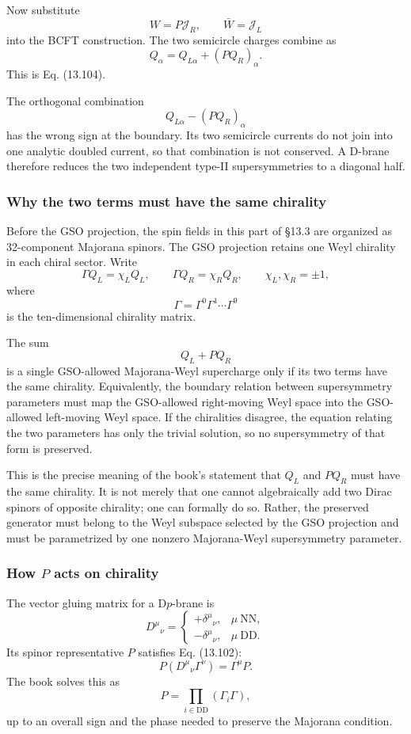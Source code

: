 \documentclass[
  10pt,
  a4paper,
  openany]{book}
\begin{document}
Now substitute \[
W=P\mathcal J_R,
\qquad
\bar W=\mathcal J_L
\] into the BCFT construction. The two semicircle charges combine as \[
\boxed{
Q_\alpha
=Q_{L\alpha}+(P Q_R)_\alpha.
}
\] This is Eq. (13.104).

The orthogonal combination \[
Q_{L\alpha}-(P Q_R)_\alpha
\] has the wrong sign at the boundary. Its two semicircle currents do
not join into one analytic doubled current, so that combination is not
conserved. A D-brane therefore reduces the two independent type-II
supersymmetries to a diagonal half.

\subsubsection{Why the two terms must have the same
chirality}\label{why-the-two-terms-must-have-the-same-chirality}

Before the GSO projection, the spin fields in this part of §13.3 are
organized as 32-component Majorana spinors. The GSO projection retains
one Weyl chirality in each chiral sector. Write \[
\Gamma Q_L=\chi_L Q_L,
\qquad
\Gamma Q_R=\chi_R Q_R,
\qquad
\chi_L,\chi_R=\pm1,
\] where \[
\Gamma=\Gamma^0\Gamma^1\cdots\Gamma^9
\] is the ten-dimensional chirality matrix.

The sum \[
Q_L+P Q_R
\] is a single GSO-allowed Majorana-Weyl supercharge only if its two
terms have the same chirality. Equivalently, the boundary relation
between supersymmetry parameters must map the GSO-allowed right-moving
Weyl space into the GSO-allowed left-moving Weyl space. If the
chiralities disagree, the equation relating the two parameters has only
the trivial solution, so no supersymmetry of that form is preserved.

This is the precise meaning of the book's statement that \(Q_L\) and
\(P Q_R\) must have the same chirality. It is not merely that one cannot
algebraically add two Dirac spinors of opposite chirality; one can
formally do so. Rather, the preserved generator must belong to the Weyl
subspace selected by the GSO projection and must be parametrized by one
nonzero Majorana-Weyl supersymmetry parameter.

\subsubsection{\texorpdfstring{How \(P\) acts on
chirality}{How P acts on chirality}}\label{how-p-acts-on-chirality}

The vector gluing matrix for a D\(p\)-brane is \[
D^\mu{}_\nu
=
\begin{cases}
+\delta^\mu{}_\nu,&\mu\ \text{NN},\\
-\delta^\mu{}_\nu,&\mu\ \text{DD}.
\end{cases}
\] Its spinor representative \(P\) satisfies Eq. (13.102): \[
P\left(D^\mu{}_\nu\Gamma^\nu\right)
=\Gamma^\mu P.
\] The book solves this as \[
P
=
\prod_{i\in\mathrm{DD}}
\left(\Gamma_i\Gamma\right),
\] up to an overall sign and the phase needed to preserve the Majorana
condition.
\end{document}
